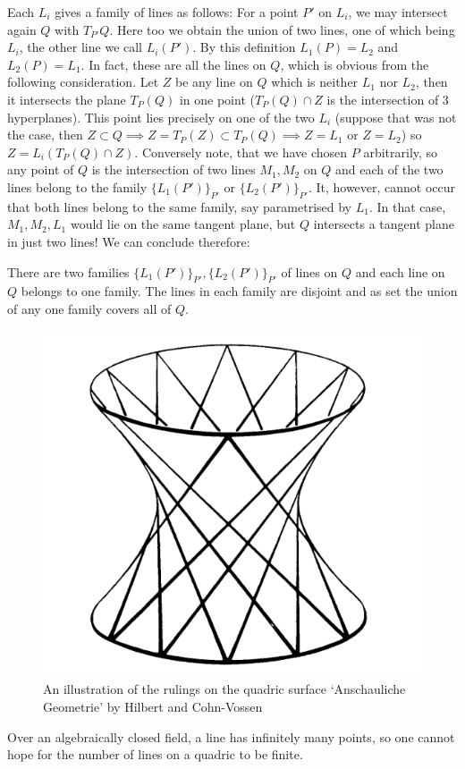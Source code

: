 Each $L_i$ gives a family of lines as follows: For a point $P'$ on $L_i$, we may intersect again $Q$ with $T_{P'}Q$. Here too we obtain the union of two lines, one of which being $L_i$, the other line we call $L_i(P')$.
By this definition $L_1(P) = L_2$ and $L_2(P) = L_1$.
In fact, these are all the lines on $Q$, which is obvious from the following consideration.
Let $Z$ be any line on $Q$ which is neither $L_1$ nor $L_2$, then it intersects the plane $T_P(Q)$ in one point ($T_P(Q) \cap Z$ is the intersection of 3 hyperplanes).
This point lies precisely on one of the two $L_i$ (suppose that was not the case, then $Z \subset Q \implies Z = T_P(Z) \subset T_P(Q) \implies Z=L_1 \text{ or } Z=L_2$) so $Z = L_i(T_P(Q)\cap Z)$.
Conversely note, that we have chosen $P$ arbitrarily, so any point of $Q$ is the intersection of two lines $M_1,M_2$ on $Q$ and each of the two lines belong to the family $\{L_1(P')\}_{P'}$ or $\{L_2(P')\}_{P'}$.
It, however, cannot occur that both lines belong to the same family, say parametrised by $L_1$. In that case, $M_1,M_2,L_1$ would lie on the same tangent plane, but $Q$ intersects a tangent plane in just two lines!
We can conclude therefore:
\begin{proposition}
There are two families $\{ L_1(P') \}_{P'},\{ L_2(P') \}_{P'}$ of lines on $Q$ and each line on $Q$ belongs to one family. The lines in each family are disjoint and as set the union of any one family covers all of $Q$.
\end{proposition}

\begin{figure}
\center
\includegraphics[width=.4\textwidth]{img/ruledsurface-hilbert.png}
\caption{An illustration of the rulings on the quadric surface `Anschauliche Geometrie' by Hilbert and Cohn-Vossen \cite[figure 17]{cohn1990geometry}}
\end{figure}

\begin{remark}
Over an algebraically closed field, a line has infinitely many points, so one cannot hope for the number of lines on a quadric to be finite.
\end{remark}

